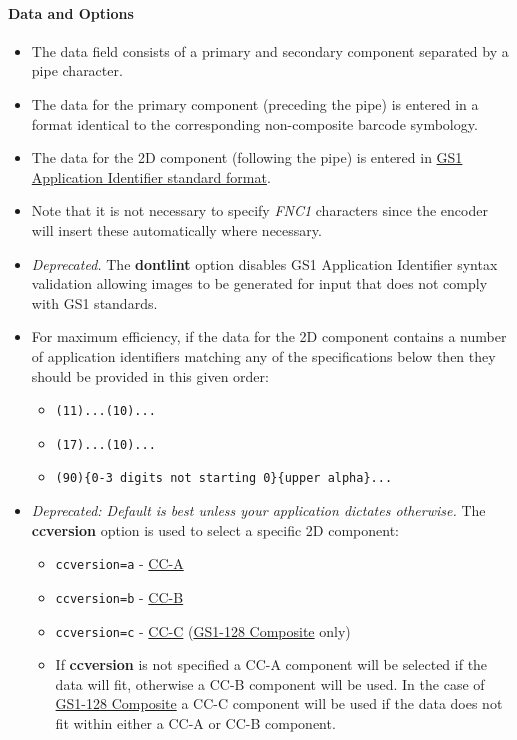 \hypertarget{data-and-options-79}{%
\paragraph{Data and Options}\label{data-and-options-79}}

\begin{itemize}
\tightlist
\item
  The data field consists of a primary and secondary component separated
  by a pipe \texttt{\textbar{}} character.
\item
  The data for the primary component (preceding the pipe) is entered in
  a format identical to the corresponding non-composite barcode
  symbology.
\item
  The data for the 2D component (following the pipe) is entered in
  \protect\hyperlink{gs1-application-identifier-standard-format}{GS1
  Application Identifier standard format}.
\item
  Note that it is not necessary to specify \emph{FNC1} characters since
  the encoder will insert these automatically where necessary.
\item
  \emph{Deprecated.} The \textbf{dontlint} option disables GS1
  Application Identifier syntax validation allowing images to be
  generated for input that does not comply with GS1 standards.
\item
  For maximum efficiency, if the data for the 2D component contains a
  number of application identifiers matching any of the specifications
  below then they should be provided in this given order:

  \begin{itemize}
  \tightlist
  \item
    \texttt{(11)...(10)...}
  \item
    \texttt{(17)...(10)...}
  \item
    \texttt{(90)\{0-3\ digits\ not\ starting\ 0\}\{upper\ alpha\}...}
  \end{itemize}
\item
  \emph{Deprecated: Default is best unless your application dictates
  otherwise.} The \textbf{ccversion} option is used to select a specific
  2D component:

  \begin{itemize}
  \tightlist
  \item
    \texttt{ccversion=a} - \protect\hyperlink{cc-a}{CC-A}
  \item
    \texttt{ccversion=b} - \protect\hyperlink{cc-b}{CC-B}
  \item
    \texttt{ccversion=c} - \protect\hyperlink{cc-c}{CC-C}
    (\protect\hyperlink{gs1-128-composite}{GS1-128 Composite} only)
  \item
    If \textbf{ccversion} is not specified a CC-A component will be
    selected if the data will fit, otherwise a CC-B component will be
    used. In the case of \protect\hyperlink{gs1-128-composite}{GS1-128
    Composite} a CC-C component will be used if the data does not fit
    within either a CC-A or CC-B component.
  \end{itemize}
\end{itemize}

